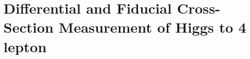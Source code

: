 \chapter{Differential and Fiducial Cross-Section Measurement of Higgs to 4 lepton}
\label{ch:differentialFiducialXS_H4l}
